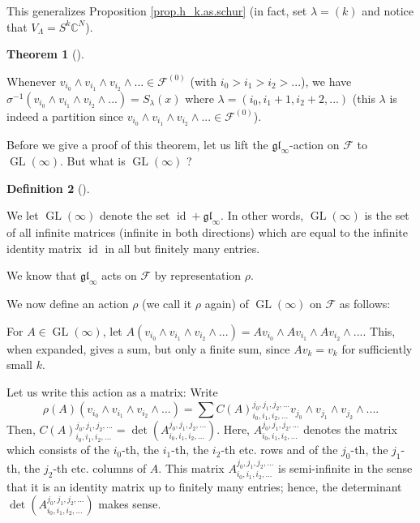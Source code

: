 \documentclass
[numbers=enddot,12pt,final,onecolumn,german,notitlepage]{scrartcl}%
\theoremstyle{definition}
\newtheorem{theo}{Theorem}
\newenvironment{theorem}[1][]
{\begin{theo}[#1]\begin{leftbar}}
{\end{leftbar}\end{theo}}
\newtheorem{defi}[theo]{Definition}
\newenvironment{definition}[1][]
{\begin{defi}[#1]\begin{leftbar}}
{\end{leftbar}\end{defi}}
\begin{document}
This generalizes Proposition \ref{prop.h_k.as.schur} (in fact, set
$\lambda=\left(  k\right)  $ and notice that $V_{\Lambda}=S^{k}\mathbb{C}^{N}$).

\begin{theorem}
\label{thm.schur}Whenever $v_{i_{0}}\wedge v_{i_{1}}\wedge v_{i_{2}}%
\wedge...\in\mathcal{F}^{\left(  0\right)  }$ (with $i_{0}>i_{1}>i_{2}>...$),
we have $\sigma^{-1}\left(  v_{i_{0}}\wedge v_{i_{1}}\wedge v_{i_{2}}%
\wedge...\right)  =S_{\lambda}\left(  x\right)  $ where $\lambda=\left(
i_{0},i_{1}+1,i_{2}+2,...\right)  $ (this $\lambda$ is indeed a partition
since $v_{i_{0}}\wedge v_{i_{1}}\wedge v_{i_{2}}\wedge...\in\mathcal{F}%
^{\left(  0\right)  }$).
\end{theorem}

Before we give a proof of this theorem, let us lift the $\mathfrak{gl}%
_{\infty}$-action on $\mathcal{F}$ to $\operatorname*{GL}\left(
\infty\right)  $. But what is $\operatorname*{GL}\left(  \infty\right)  $ ?

\begin{definition}
We let $\operatorname*{GL}\left(  \infty\right)  $ denote the set
$\operatorname*{id}+\mathfrak{gl}_{\infty}$. In other words,
$\operatorname*{GL}\left(  \infty\right)  $ is the set of all infinite
matrices (infinite in both directions) which are equal to the infinite
identity matrix $\operatorname*{id}$ in all but finitely many entries.
\end{definition}

We know that $\mathfrak{gl}_{\infty}$ acts on $\mathcal{F}$ by representation
$\rho$.

We now define an action $\rho$ (we call it $\rho$ again) of
$\operatorname*{GL}\left(  \infty\right)  $ on $\mathcal{F}$ as follows:

For $A\in\operatorname*{GL}\left(  \infty\right)  $, let $A\left(  v_{i_{0}%
}\wedge v_{i_{1}}\wedge v_{i_{2}}\wedge...\right)  =Av_{i_{0}}\wedge
Av_{i_{1}}\wedge Av_{i_{2}}\wedge...$. This, when expanded, gives a sum, but
only a finite sum, since $Av_{k}=v_{k}$ for sufficiently small $k$.

Let us write this action as a matrix: Write%
\[
\rho\left(  A\right)  \left(  v_{i_{0}}\wedge v_{i_{1}}\wedge v_{i_{2}}%
\wedge...\right)  =\sum C\left(  A\right)  _{i_{0},i_{1},i_{2},...}%
^{j_{0},j_{1},j_{2},...}v_{j_{0}}\wedge v_{j_{1}}\wedge v_{j_{2}}\wedge....
\]
Then, $C\left(  A\right)  _{i_{0},i_{1},i_{2},...}^{j_{0},j_{1},j_{2}%
,...}=\det\left(  A_{i_{0},i_{1},i_{2},...}^{j_{0},j_{1},j_{2},...}\right)  $.
Here, $A_{i_{0},i_{1},i_{2},...}^{j_{0},j_{1},j_{2},...}$ denotes the matrix
which consists of the $i_{0}$-th, the $i_{1}$-th, the $i_{2}$-th etc. rows and
of the $j_{0}$-th, the $j_{1}$-th, the $j_{2}$-th etc. columns of $A$. This
matrix $A_{i_{0},i_{1},i_{2},...}^{j_{0},j_{1},j_{2},...}$ is semi-infinite in
the sense that it is an identity matrix up to finitely many entries; hence,
the determinant $\det\left(  A_{i_{0},i_{1},i_{2},...}^{j_{0},j_{1},j_{2}%
,...}\right)  $ makes sense.
\end{document}
